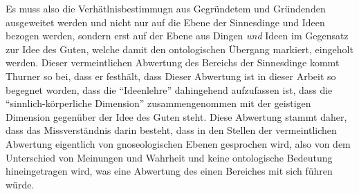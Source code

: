 Es muss also die Verhätlnisbestimmugn aus Gegründetem und Gründenden ausgeweitet werden und nicht nur auf die Ebene der Sinnesdinge und Ideen bezogen werden, sondern erst auf der Ebene aus Dingen \emph{und} Ideen im Gegensatz zur Idee des Guten, welche damit den ontologischen Übergang markiert, eingeholt werden.
Dieser vermeintlichen Abwertung des Bereichs der Sinnesdinge kommt Thurner so bei, dass er festhält, dass 
Dieser Abwertung ist in dieser Arbeit so begegnet worden, dass die \enquote{Ideenlehre} dahingehend aufzufassen ist, dass die \enquote{sinnlich-körperliche Dimension} zusammengenommen mit der geistigen Dimension gegenüber der Idee des Guten steht. Diese Abwertung stammt daher, dass das Missverständnis darin besteht, dass in den Stellen der vermeintlichen Abwertung eigentlich von gnoseologischen Ebenen gesprochen wird, also von dem Unterschied von Meinungen und Wahrheit und keine ontologische Bedeutung hineingetragen wird, was eine Abwertung des einen Bereiches mit sich führen würde.
